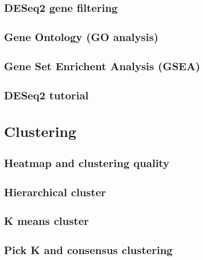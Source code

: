 \documentclass[
]{book}
\begin{document}
\hypertarget{deseq2-gene-filtering}{%
\section{DESeq2 gene filtering}\label{deseq2-gene-filtering}}

\hypertarget{gene-ontology-go-analysis}{%
\section{Gene Ontology (GO analysis)}\label{gene-ontology-go-analysis}}

\hypertarget{gene-set-enrichent-analysis-gsea}{%
\section{Gene Set Enrichent Analysis (GSEA)}\label{gene-set-enrichent-analysis-gsea}}

\hypertarget{deseq2-tutorial}{%
\section{DESeq2 tutorial}\label{deseq2-tutorial}}

\hypertarget{cluster}{%
\chapter{Clustering}\label{cluster}}

\hypertarget{heatmap-and-clustering-quality}{%
\section{Heatmap and clustering quality}\label{heatmap-and-clustering-quality}}

\hypertarget{hierarchical-cluster}{%
\section{Hierarchical cluster}\label{hierarchical-cluster}}

\hypertarget{k-means-cluster}{%
\section{K means cluster}\label{k-means-cluster}}

\hypertarget{pick-k-and-consensus-clustering}{%
\section{Pick K and consensus clustering}\label{pick-k-and-consensus-clustering}}
\end{document}
